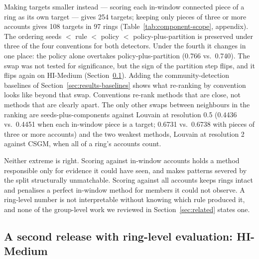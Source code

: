Making targets smaller instead --- scoring each in-window connected piece of a ring as its own
target --- gives 254 targets; keeping only pieces of three or more accounts gives 108 targets
in 97 rings (Table~\ref{tab:component-scope}, appendix). The ordering
seeds $<$ rule $<$ policy $<$ policy-plus-partition is preserved under three of the four
conventions for both detectors. Under the fourth it changes in one place: the policy alone
overtakes policy-plus-partition (0.766 vs.\ 0.740). The swap was not tested for significance,
but the sign of the partition step flips, and it flips again on HI-Medium
(Section~\ref{sec:findings-hm}).
Adding the community-detection baselines of Section~\ref{sec:results-baselines} shows what
re-ranking by convention looks like beyond that swap. Conventions re-rank methods that are
close, not methods that are clearly apart. The only other swaps between neighbours in the
ranking are seeds-plus-components against Louvain at resolution 0.5 (0.4436 vs.\ 0.4451 when
each in-window piece is a target; 0.6731 vs.\ 0.6738 with pieces of three or more accounts)
and the two weakest methods, Louvain at resolution 2 against CSGM, when all of a ring's
accounts count.

Neither extreme is right. Scoring against in-window accounts holds a method responsible only
for evidence it could have seen, and makes patterns severed by the split structurally
unmatchable. Scoring against all accounts keeps rings intact and penalises a perfect in-window
method for members it could not observe. A ring-level number is not interpretable without
knowing which rule produced it, and none of the group-level work we reviewed in
Section~\ref{sec:related} states one.

\subsection{A second release with ring-level evaluation: HI-Medium}
\label{sec:findings-hm}

